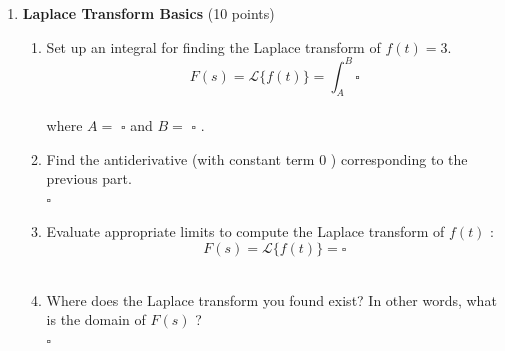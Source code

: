 \begin{enumerate}
  \item \textbf{Laplace Transform Basics} (10 points)\\
  \begin{enumerate}[label=(\alph*)]
    \item Set up an integral for finding the Laplace transform of $f(t)=3$.\\
    $$
    F(s)=\mathcal{L}\{f(t)\}=\int_A^B \square
    $$\\
    where $A=$ $\square$ and $B=$ $\square$ .\\
    \begin{subanswer}
    \end{subanswer}
    \item Find the antiderivative (with constant term 0 ) corresponding to the previous part.\\
    $\square$\\
    \begin{subanswer}
    \end{subanswer}
    \item Evaluate appropriate limits to compute the Laplace transform of $f(t)$ :\\
    $$
    F(s)=\mathcal{L}\{f(t)\}=\square
    $$\\
    \begin{subanswer}
    \end{subanswer}
    \item Where does the Laplace transform you found exist? In other words, what is the domain of $F(s)$ ?\\
    $\square$\\
    \begin{subanswer}
    \end{subanswer}
  \end{enumerate}


\end{enumerate}
